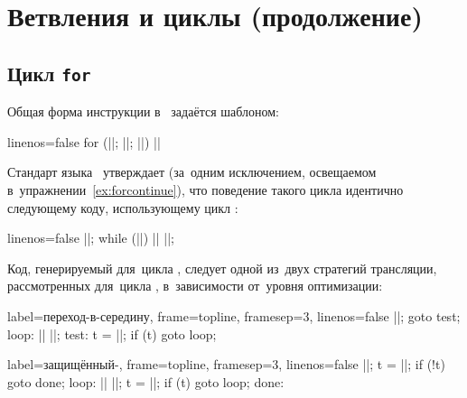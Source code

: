 
\chapter{Ветвления и циклы (продолжение)}

\section{Цикл \texttt{for}}\label{sect:for}
Общая форма инструкции  в~ задаётся шаблоном:

\begin{ccode*}{linenos=false}
for (||; ||; ||)
  ||
\end{ccode*}

\noindent Стандарт языка~ утверждает (за~одним исключением, освещаемом в~упражнении~\ref{ex:forcontinue}), что поведение такого цикла идентично следующему коду, использующему цикл :

\begin{ccode*}{linenos=false}
||;
while (||)
{
  ||
  ||;
}
\end{ccode*}

Код, генерируемый \GCC{} для~цикла , следует одной из~двух стратегий трансляции, рассмотренных для~цикла , в~зависимости от~уровня оптимизации:

\begin{flushleft}\begin{minipage}[t]{0.3\textwidth}
\begin{ccode*}{label=\textrm{переход-в-середину}, frame=topline, framesep=3\fboxsep, linenos=false}
  ||;
  goto test;
loop:
  ||
  ||;
test:
  t = ||;
  if (t)
    goto loop;
\end{ccode*}
\end{minipage}\qquad\begin{minipage}[t]{0.3\textwidth}
\begin{ccode*}{label=\textrm{защищённый-}, frame=topline, framesep=3\fboxsep, linenos=false}
  ||;
  t = ||;
  if (!t)
    goto done;
loop:
  ||
  ||;
  t = ||;
  if (t)
    goto loop;
done:
\end{ccode*}
\end{minipage}\end{flushleft}



